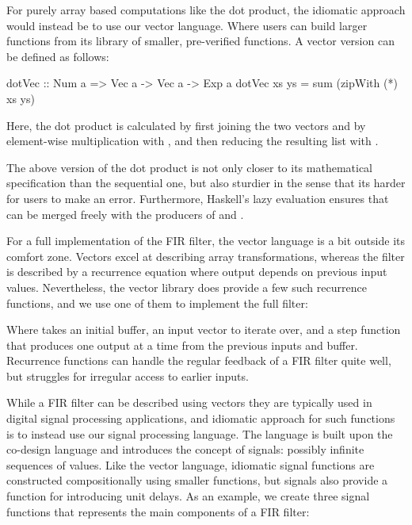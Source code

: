 \documentclass[../paper.tex]{subfiles}
\begin{document}
For purely array based computations like the dot product, the idiomatic approach would instead be to use our vector language. Where users can build larger functions from its library of smaller, pre-verified functions. A vector version can be defined as follows:

\begin{code}
dotVec :: Num a => Vec a -> Vec a -> Exp a
dotVec xs ys = sum (zipWith (*) xs ys)
\end{code}

\noindent Here, the dot product is calculated by first joining the two vectors  and  by element-wise multiplication with , and then reducing the resulting list with .

The above version of the dot product is not only closer to its mathematical specification than the sequential one, but also sturdier in the sense that its harder for users to make an error. Furthermore, Haskell's lazy evaluation ensures that  can be merged freely with the producers of  and .

For a full implementation of the FIR filter, the vector language is a bit outside its comfort zone. Vectors excel at describing array transformations, whereas the filter is described by a recurrence equation where output depends on previous input values. Nevertheless, the vector library does provide a few such recurrence functions, and we use one of them to implement the full filter:


\noindent Where  takes an initial buffer, an input vector to iterate over, and a step function that produces one output at a time from the previous inputs and buffer. Recurrence functions can handle the regular feedback of a FIR filter quite well, but struggles for irregular access to earlier inputs.



While a FIR filter can be described using vectors they are typically used in digital signal processing applications, and idiomatic approach for such functions is to instead use our signal processing language.  The language is built upon the co-design language and introduces the concept of signals: possibly infinite sequences of values. Like the vector language, idiomatic signal functions are constructed compositionally using smaller functions, but signals also provide a function for introducing unit delays. As an example, we create three signal functions that represents the main components of a FIR filter:
\end{document}
